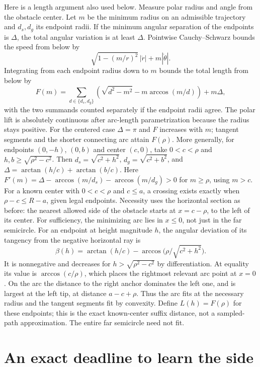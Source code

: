 \documentclass[11pt]{article}
\begin{document}
Here is a length argument also used below. Measure polar radius and
angle from the obstacle center. Let \(m\) be the minimum radius on an
admissible trajectory and \(d_s,d_g\) its endpoint radii. If the minimum
angular separation of the endpoints is \(\Delta\), the total angular
variation is at least \(\Delta\). Pointwise Cauchy--Schwarz bounds the
speed from below by
\[
       \sqrt{1-(m/r)^2}\,|\dot r|+m|\dot\theta|.
\]
Integrating from each endpoint radius down to \(m\) bounds the total
length from below by
\[
 F(m)=\sum_{d\in\{d_s,d_g\}}
       \left(\sqrt{d^2-m^2}-m\arccos(m/d)\right)+m\Delta ,
\]
with the two summands counted separately if the endpoint radii agree.
The polar lift is absolutely continuous after arc-length
parametrization because the radius stays positive. For the centered
case \(\Delta=\pi\) and \(F\) increases with \(m\); tangent segments
and the shorter connecting arc attain \(F(\rho)\).
More generally, for endpoints \((0,-h)\), \((0,b)\) and center
\((c,0)\), take \(0<c<\rho\) and \(h,b\geq\sqrt{\rho^2-c^2}\).
Then \(d_s=\sqrt{c^2+h^2}\), \(d_g=\sqrt{c^2+b^2}\), and
\(\Delta=\arctan(h/c)+\arctan(b/c)\).
Here \(F'(m)=\Delta-\arccos(m/d_s)-\arccos(m/d_g)>0\)
for \(m\geq\rho\), using \(m>c\).
For a known center with \(0<c<\rho\) and \(c\leq a\),
a crossing exists exactly when \(\rho-c\leq R-a\), given
legal endpoints. Necessity uses the horizontal section as
before: the nearest allowed side of the obstacle starts
at \(x=c-\rho\), to the left of its center. For sufficiency,
the minimizing arc lies in \(x\leq0\), not just in the far
semicircle. For an endpoint at height magnitude \(h\),
the angular deviation of its tangency from the negative
horizontal ray is
\[
     \beta(h)=\arctan(h/c)-\arccos\bigl(\rho/\sqrt{c^2+h^2}\bigr).
\]
It is nonnegative and decreases for \(h>\sqrt{\rho^2-c^2}\)
by differentiation. At equality its value is
\(\arccos(c/\rho)\), which places the rightmost relevant
arc point at \(x=0\). On the arc the distance to the right
anchor dominates the left one, and is largest at the
left tip, at distance \(a-c+\rho\). Thus the arc fits at the
necessary radius and the tangent segments fit by convexity.
Define \(L(h)=F(\rho)\) for these endpoints; this is the exact
known-center suffix distance, not a sampled-path approximation.
The entire far semicircle need not fit.

\section{An exact deadline to learn the side}
\end{document}
